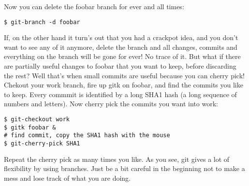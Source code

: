 \documentclass[a4paper,10pt]{article}
\begin{document}
Now you can delete the foobar branch for ever and all times:

\begin{verbatim}
$ git-branch -d foobar
\end{verbatim}

If, on the other hand it turn's out that you had a crackpot idea, and you
don't want to see any of it anymore, delete the branch and all changes,
commits and everything on the branch will be gone for ever! No trace of it.
But what if there are partially useful changes to foobar that you want to
keep, before discarding the rest? Well that's when small commits are useful
because you can cherry pick! Chekout your work branch, fire up gitk on foobar,
and find the commits you like to keep. Every commmit is identified by a long
SHA1 hash (a long sequence of numbers and letters). Now cherry pick the
commits you want into work:

\begin{verbatim}
$ git-checkout work
$ gitk foobar &
# find commit, copy the SHA1 hash with the mouse
$ git-cherry-pick SHA1
\end{verbatim}

Repeat the cherry pick as many times you like. As you see, git gives a lot of
flexibility by using branches. Just be a bit careful in the beginning not to
make a mess and lose track of what you are doing. 
\end{document}
